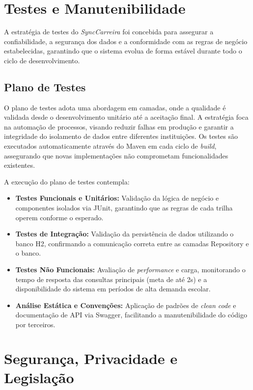 \section{Testes e Manutenibilidade}

A estratégia de testes do \textit{SyncCarreira} foi concebida para assegurar a confiabilidade, a segurança dos dados e a conformidade com as regras de negócio estabelecidas, garantindo que o sistema evolua de forma estável durante todo o ciclo de desenvolvimento.

\subsection{Plano de Testes}

O plano de testes adota uma abordagem em camadas, onde a qualidade é validada desde o desenvolvimento unitário até a aceitação final. A estratégia foca na automação de processos, visando reduzir falhas em produção e garantir a integridade do isolamento de dados entre diferentes instituições. Os testes são executados automaticamente através do Maven em cada ciclo de \textit{build}, assegurando que novas implementações não comprometam funcionalidades existentes.

A execução do plano de testes contempla:

\begin{itemize}
    \item \textbf{Testes Funcionais e Unitários:} Validação da lógica de negócio e componentes isolados via JUnit, garantindo que as regras de cada trilha operem conforme o esperado.

    \item \textbf{Testes de Integração:} Validação da persistência de dados utilizando o banco H2, confirmando a comunicação correta entre as camadas Repository e o banco.

    \item \textbf{Testes Não Funcionais:} Avaliação de \textit{performance} e carga, monitorando o tempo de resposta das consultas principais (meta de até 2s) e a disponibilidade do sistema em períodos de alta demanda escolar.

    \item \textbf{Análise Estática e Convenções:} Aplicação de padrões de \textit{clean code} e documentação de API via Swagger, facilitando a manutenibilidade do código por terceiros.
\end{itemize}

\section{Segurança, Privacidade e Legislação}

